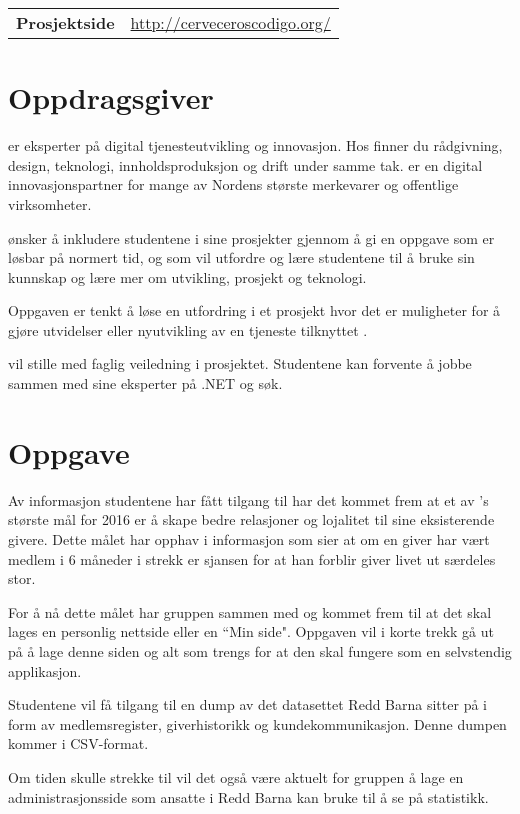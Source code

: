 \begin{flushleft}
\begin{tabular}[ht]{@{}lp{100mm}@{}}
\textbf{Prosjektside} & \url{http://cerveceroscodigo.org/} \\
\end{tabular} 
\end{flushleft}

\section{Oppdragsgiver}
\mw{} er eksperter på digital tjenesteutvikling og innovasjon. Hos \mw{} finner du rådgivning, design, teknologi, innholdsproduksjon og drift under samme tak. \mw{} er en digital innovasjonspartner for mange av Nordens største merkevarer og offentlige virksomheter.

\mw{} ønsker å inkludere studentene i sine prosjekter gjennom å gi en oppgave som er løsbar på normert tid, og som vil utfordre og lære studentene til å bruke sin kunnskap og lære mer om utvikling, prosjekt og teknologi.

Oppgaven er tenkt å løse en utfordring i et prosjekt hvor det er muligheter for å gjøre utvidelser eller nyutvikling av en tjeneste tilknyttet \rb{}.

\mw{} vil stille med faglig veiledning i prosjektet. Studentene kan forvente å jobbe sammen med \mw{} sine eksperter på .NET og søk.

\section{Oppgave}
Av informasjon studentene har fått tilgang til har det kommet frem at et av \rb{}'s største mål for 2016 er å skape bedre relasjoner og lojalitet til sine eksisterende givere. Dette målet har opphav i informasjon som sier at om en giver har vært medlem i 6 måneder i strekk er sjansen for at han forblir giver livet ut særdeles stor.

For å nå dette målet har gruppen sammen med \mw{} og \rb{} kommet frem til at det skal lages en personlig nettside eller en ``Min side". Oppgaven vil i korte trekk gå ut på å lage denne siden og alt som trengs for at den skal fungere som en selvstendig applikasjon.

Studentene vil få tilgang til en dump av det datasettet Redd Barna sitter på i form av medlemsregister, giverhistorikk og kundekommunikasjon. Denne dumpen kommer i CSV-format.

Om tiden skulle strekke til vil det også være aktuelt for gruppen å lage en administrasjonsside som ansatte i Redd Barna kan bruke til å se på statistikk.